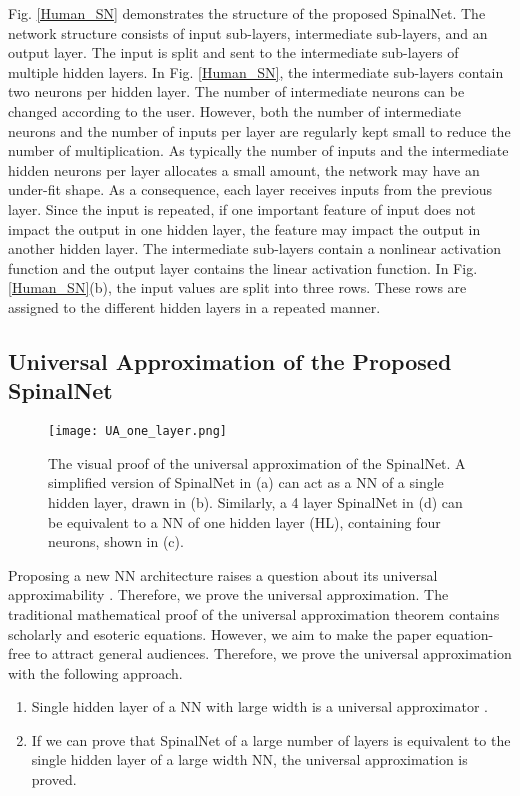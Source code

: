 \documentclass[journal]{IEEEtran}
\begin{document}
Fig. \ref{Human_SN} demonstrates the structure of the proposed SpinalNet. The network structure consists of input sub-layers, intermediate sub-layers, and an output layer. The input is split and sent to the intermediate sub-layers of multiple hidden layers. In Fig. \ref{Human_SN}, the intermediate sub-layers contain two neurons per hidden layer. The number of intermediate neurons can be changed according to the user. However, both the number of intermediate neurons and the number of inputs per layer are regularly kept small to reduce the number of multiplication. As typically the number of inputs and the intermediate hidden neurons per layer allocates a small amount, the network may have an under-fit shape. As a consequence, each layer receives inputs from the previous layer. Since the input is repeated, if one important feature of input does not impact the output in one hidden layer, the feature may impact the output in another hidden layer. The intermediate sub-layers contain a nonlinear activation function and the output layer contains the linear activation function. 
In Fig. \ref{Human_SN}(b), the input values are split into three rows. These rows are assigned to the different hidden layers in a repeated manner. 

\subsection{Universal Approximation of the Proposed SpinalNet}
\begin{figure}
  \centering
  \texttt{[image: UA\_one\_layer.png]}
  \caption{The visual proof of the universal approximation of the SpinalNet. A simplified version of SpinalNet in (a) can act as a NN of a single hidden layer, drawn in (b). Similarly, a 4 layer SpinalNet in (d) can be equivalent to a NN of one hidden layer (HL), containing four neurons, shown in (c). }
  \label{UApprox}
\end{figure}
Proposing a new NN architecture raises a question about its universal approximability \cite{lin2018resnet,fan2020universal}. Therefore, we prove the universal approximation. The traditional mathematical proof of the universal approximation theorem contains scholarly and esoteric equations. However, we aim to make the paper equation-free to attract general audiences. Therefore, we prove the universal approximation with the following approach.
\begin{enumerate}
  \item Single hidden layer of a NN with large width is a universal approximator \cite{csaji2001approximation}.
  \item If we can prove that SpinalNet of a large number of layers is equivalent to the single hidden layer of a large width NN, the universal approximation is proved.
\end{enumerate}  
\end{document}
